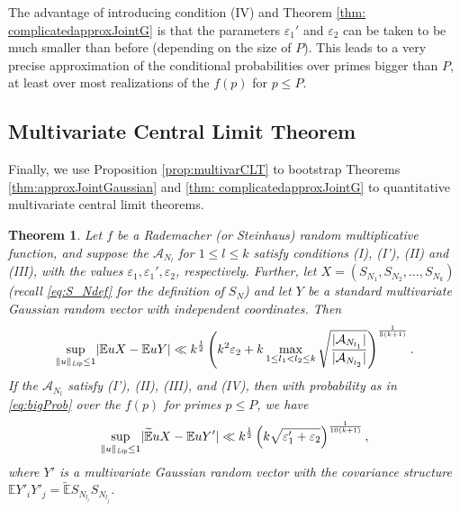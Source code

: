 \documentclass[11pt]{tran-l}
\newtheorem{theorem}{Theorem}[section]
\theoremstyle{definition}
\theoremstyle{remark}
\numberwithin{equation}{section}
\begin{document}
The advantage of introducing condition (IV) and Theorem \ref{thm: complicatedapproxJointG} is that the parameters $\varepsilon_1'$ and $\varepsilon_2$ can be taken to be much smaller than before (depending on the size of $P$). This leads to a very precise approximation of the conditional probabilities over primes bigger than $P$, at least over most realizations of the $f(p)$ for $p\leq P$. 

\subsection{Multivariate Central Limit Theorem} Finally, we use Proposition \ref{prop:multivarCLT} to bootstrap Theorems \ref{thm:approxJointGaussian} and \ref{thm: complicatedapproxJointG} to quantitative multivariate central limit theorems.     

\begin{theorem}\label{thm:MCLT} Let $f$ be a Rademacher (or Steinhaus) random multiplicative function, and suppose the $\mathcal A_{N_l}$ for $1\leq l\leq k$ satisfy conditions (I), (I'), (II) and (III), with the values $\varepsilon_1, \varepsilon_1', \varepsilon_2$, respectively. Further, let $X=(S_{N_1}, S_{N_2}, \ldots, S_{N_k})$ (recall \eqref{eq:S_Ndef} for the definition of $S_N$) and let $Y$ be a standard multivariate Gaussian random vector with independent coordinates. Then 
\begin{equation}
 \sup_{\|u\|_{\emph{Lip}}\leq 1} \lvert \mathbb EuX - \mathbb EuY\rvert\ll k^{\frac{1}{2}}  \left(k^2\varepsilon_2 + k \max_{1\leq l_1<l_2\leq k} \sqrt{\frac{\lvert \mathcal A_{N_{l_1}}\rvert}{\lvert \mathcal A_{N_{l_2}}\rvert}} \right)^{\frac1{5(k+1)}}.
 \end{equation}
If the $\mathcal A_{N_l}$ satisfy (I'), (II), (III), and (IV), then with probability as in \eqref{eq:bigProb} over the $f(p)$ for primes $p\leq P$, we have 
 \begin{equation}
 \sup_{\|u\|_{\emph{Lip}}\leq 1} \lvert \widetilde{\mathbb E}uX - \mathbb EuY'\rvert \\ \ll k^{\frac{1}{2}} \left(k\sqrt{\varepsilon_1' + \varepsilon_2}\right)^{\frac1{10(k+1)}},
 \end{equation}
 where $Y'$ is a multivariate Gaussian random vector with the covariance structure $\mathbb EY'_iY'_j = \widetilde{\mathbb E}S_{N_{l_i}} S_{N_{l_j}}.$
\end{theorem}
\end{document}
